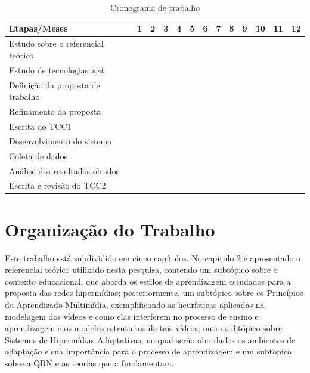 {
\begin{table}
	\centering
	\begin{tabular}{| p{6cm} | c | c | c | c | c | c | c | c | c | c | c | c |}
	\hline
	\rowcolor{lightgray} Etapas/Meses & 1 & 2 & 3 & 4 & 5 & 6 & 7 & 8 & 9 & 10 & 11 & 12 \\
	\hline
	Estudo sobre o referencial teórico & \cellcolor[HTML]{888888} & \cellcolor[HTML]{888888} & \cellcolor[HTML]{888888} & & & & & & & & & \\
	\hline
	Estudo de tecnologias \textit{web} & & & \cellcolor[HTML]{888888} & \cellcolor[HTML]{888888} & & & & & & & & \\
	\hline
	Definição da proposta de trabalho & & & & \cellcolor[HTML]{888888} & & & & & & & & \\
	\hline
	Refinamento da proposta & & & & \cellcolor[HTML]{888888} & \cellcolor[HTML]{888888} & & & & & & & \\
	\hline
	Escrita do TCC1 & & & & & \cellcolor[HTML]{888888} & \cellcolor[HTML]{888888} & & & & & & \\
	\hline
	Desenvolvimento do sistema & & & & & \cellcolor[HTML]{888888} & \cellcolor[HTML]{888888} & \cellcolor[HTML]{888888} & \cellcolor[HTML]{888888} & \cellcolor[HTML]{888888} & \cellcolor[HTML]{888888} & \cellcolor[HTML]{888888} & \\
	\hline
	Coleta de dados & & & & & & & & & \cellcolor[HTML]{888888} & \cellcolor[HTML]{888888} & \cellcolor[HTML]{888888} & \\
	\hline
	Análise dos resultados obtidos & & & & & & & & & \cellcolor[HTML]{888888} & \cellcolor[HTML]{888888} & \cellcolor[HTML]{888888} & \cellcolor[HTML]{888888} \\
	\hline
	Escrita e revisão do TCC2 & & & & & & & & & & & \cellcolor[HTML]{888888} & \cellcolor[HTML]{888888} \\
	\hline
	\end{tabular}
	\caption{Cronograma de trabalho}
\end{table}
{

\section[Organização do Trabalho]{Organização do Trabalho}

Este trabalho está subdividido em cinco capítulos. No capítulo 2 é apresentado o referencial teórico utilizado nesta pesquisa, contendo um subtópico sobre o contexto educacional, que aborda os estilos de aprendizagem estudados para a proposta das redes hipermídias; posteriormente, um subtópico sobre os Princípios do Aprendizado Multimídia, exemplificando as heurísticas aplicadas na modelagem dos vídeos e como elas interferem no processo de ensino e aprendizagem e os modelos estruturais de tais vídeos; outro subtópico sobre Sistemas de Hipermídias Adaptativas, no qual serão abordados os ambientes de adaptação e sua importância para o processo de aprendizagem e um subtópico sobre a QRN e as teorias que a fundamentam.

}}
